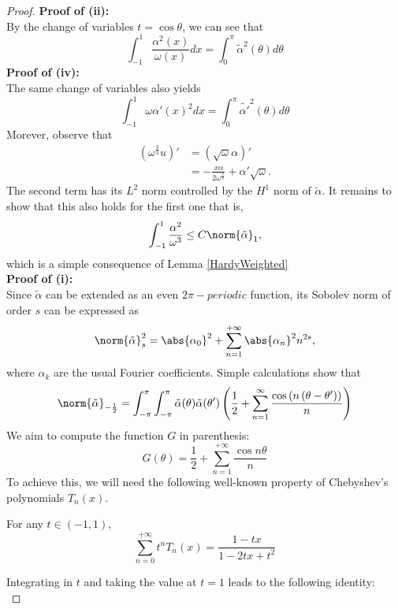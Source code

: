 \documentclass[11pt,a4paper]{article}
\begin{document}
	\begin{proof}
		\textbf{Proof of (ii):}\\
			By the change of variables $t=\cos\theta$, we can see that
				\[ \int_{-1}^{1} \frac{\alpha^2(x)}{\omega(x)}dx = \int_{0}^\pi \tilde{\alpha}^2(\theta) d\theta\]
		\textbf{Proof of (iv):} \\
			The same change of variables also yields
				\[ \int_{-1}^{1} \omega \alpha'(x)^2dx = \int_{0}^\pi \tilde{\alpha'}^2(\theta) d\theta\] 
			Morever, observe that 
			\begin{align*}
				\left(\omega^{\frac{3}{2}}u\right)' &= \left(\sqrt{\omega}\alpha\right)'\\
				&=-\frac{x\alpha}{2\omega^{\frac{3}{2}}} + \alpha' \sqrt{\omega}. 
			\end{align*}		
			The second term has its $L^2$ norm controlled by the $H^1$ norm of $\tilde{\alpha}$. It remains to show that this also holds for the first one that is, 
				\[ \int_{-1}^1 \frac{\alpha^2}{\omega^3} \leq C \norm{\tilde{\alpha}}_{1},\]
			which is a simple consequence of Lemma \ref{HardyWeighted}\\
		\textbf{Proof of (i):}\\
			Since $\tilde{\alpha}$ can be extended as an even $2\pi-periodic$ function, its Sobolev norm of order $s$ can be expressed as 
			\begin{equation*}
				\norm{\tilde{\alpha}}_{s}^2 = \abs{\alpha_0}^2 + \sum_{n=1}^{+\infty} \abs{\alpha_n}^2 n^{2s}, 
			\end{equation*}				
			where $\alpha_k$ are the usual Fourier coefficients. Simple calculations show that 
			\begin{equation*}
				\norm{\tilde{\alpha}}_{-\frac{1}{2}} = \int_{-\pi}^{\pi}\int_{-\pi}^{\pi}\tilde{\alpha}(\theta)\tilde{\alpha}(\theta') \left(\frac{1}{2} + \sum_{n=1}^{\infty} \frac{\cos \left(n \left(\theta-\theta'\right)\right)}{n}\right)
			\end{equation*}					
			We aim to compute the function $G$ in parenthesis:
				\[G(\theta) = \frac{1}{2} + \sum_{n=1}^{+\infty} \frac{\cos n\theta}{n}\]
			To achieve this, we will need the following well-known property of Chebyshev's polynomials $T_n(x)$.
			\begin{Lem} For any $t \in (-1,1)$, 
				\[\sum_{n=0}^{+\infty} t^n T_n(x) = \frac{1-tx}{1-2tx + t^2}\]
			\end{Lem}
			Integrating in $t$ and taking the value at $t=1$ leads to the following identity: 
			\begin{equation*}

\end{equation*}
\end{proof}
\end{document}
